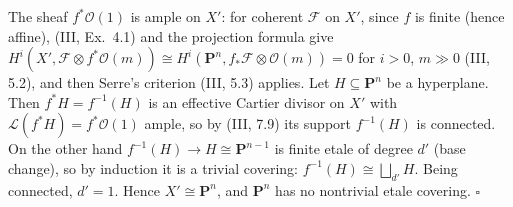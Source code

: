 \documentclass[11pt]{article}
\begin{document}
The sheaf $f^*\mathcal O(1)$ is ample on $X'$: for coherent $\mathcal F$ on $X'$, since $f$ is finite (hence affine), (III, Ex.~4.1) and the projection formula give $H^i(X',\mathcal F\otimes f^*\mathcal O(m))\cong H^i(\mathbf P^n,f_*\mathcal F\otimes\mathcal O(m))=0$ for $i>0$, $m\gg0$ (III, 5.2), and then Serre's criterion (III, 5.3) applies. Let $H\subseteq\mathbf P^n$ be a hyperplane. Then $f^*H=f^{-1}(H)$ is an effective Cartier divisor on $X'$ with $\mathcal L(f^*H)=f^*\mathcal O(1)$ ample, so by (III, 7.9) its support $f^{-1}(H)$ is connected. On the other hand $f^{-1}(H)\to H\cong\mathbf P^{n-1}$ is finite etale of degree $d'$ (base change), so by induction it is a trivial covering: $f^{-1}(H)\cong\bigsqcup_{d'}H$. Being connected, $d'=1$. Hence $X'\cong\mathbf P^n$, and $\mathbf P^n$ has no nontrivial etale covering. \hfill$\square$
\end{document}

